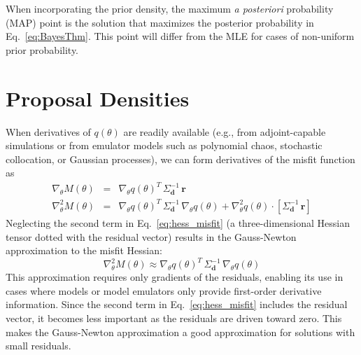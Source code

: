 When incorporating the prior density, the maximum {\it a posteriori}
probability (MAP) point is the solution that maximizes the posterior
probability in Eq.~\ref{eq:BayesThm}.  This point will differ
from the MLE for cases of non-uniform prior probability.


\section{Proposal Densities} \label{uq:bayes:prop}

When derivatives of $q(\theta)$ are readily available (e.g.,
from adjoint-capable simulations or from emulator models such as
polynomial chaos, stochastic collocation, or Gaussian processes), we
can form derivatives of the misfit function as
\begin{eqnarray}
\nabla_\theta M(\theta) &=& \nabla_\theta q(\theta)^T\,\Sigma_{\mathbf{d}}^{-1}\,\boldsymbol{r} \label{eq:grad_misfit} \\
\nabla^2_\theta M(\theta) &=& \nabla_\theta q(\theta)^T\,\Sigma_{\mathbf{d}}^{-1}\,\nabla_\theta q(\theta) + \nabla^2_\theta q(\theta) \cdot \left[\Sigma_{\mathbf{d}}^{-1}\,\boldsymbol{r}\right] \label{eq:hess_misfit}
\end{eqnarray}
Neglecting the second term in Eq.~\ref{eq:hess_misfit} (a
three-dimensional Hessian tensor dotted with the residual vector)
results in the Gauss-Newton approximation to the misfit Hessian:
\begin{equation}
\nabla^2_\theta M(\theta) \approx \nabla_\theta q(\theta)^T\,\Sigma_{\mathbf{d}}^{-1}\,\nabla_\theta q(\theta) \label{eq:hess_misfit_gn}
\end{equation}
This approximation requires only gradients of the residuals, enabling
its use in cases where models or model emulators only provide
first-order derivative information.  Since the second term in
Eq.~\ref{eq:hess_misfit} includes the residual vector, it becomes less
important as the residuals are driven toward zero.  This makes the
Gauss-Newton approximation a good approximation for solutions with
small residuals.

